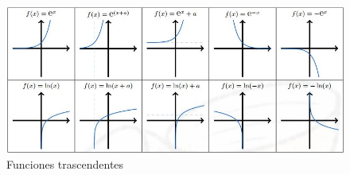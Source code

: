 \documentclass[10pt,twoside]{SelfArx} %
\begin{document}
	

	\begin{figure}[h]
	\centering
	\includegraphics[width=15cm]{funciones_4}
	\caption{Funciones trascendentes}
	\label{Funciones_trascendentes}
	\end{figure}
%
%
%
%
\newpage



\end{document}
